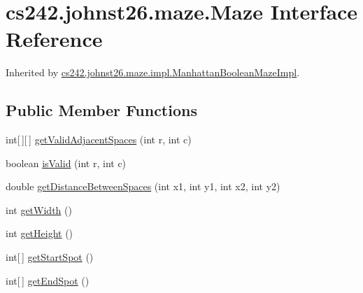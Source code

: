 \hypertarget{interfacecs242_1_1johnst26_1_1maze_1_1_maze}{\section{cs242.\-johnst26.\-maze.\-Maze Interface Reference}
\label{interfacecs242_1_1johnst26_1_1maze_1_1_maze}
}


Inherited by \hyperlink{classcs242_1_1johnst26_1_1maze_1_1impl_1_1_manhattan_boolean_maze_impl}{cs242.\-johnst26.\-maze.\-impl.\-Manhattan\-Boolean\-Maze\-Impl}.

\subsection*{Public Member Functions}
\begin{DoxyCompactItemize}
\item 
int\mbox{[}$\,$\mbox{]}\mbox{[}$\,$\mbox{]} \hyperlink{interfacecs242_1_1johnst26_1_1maze_1_1_maze_a77977c4d474be66cbcf30d4accc33a17}{get\-Valid\-Adjacent\-Spaces} (int r, int c)
\item 
boolean \hyperlink{interfacecs242_1_1johnst26_1_1maze_1_1_maze_a2fcb1817c989cb274297a026ccba8bce}{is\-Valid} (int r, int c)
\item 
double \hyperlink{interfacecs242_1_1johnst26_1_1maze_1_1_maze_a4650d241e235a30bd57dd11a01d9b7aa}{get\-Distance\-Between\-Spaces} (int x1, int y1, int x2, int y2)
\item 
int \hyperlink{interfacecs242_1_1johnst26_1_1maze_1_1_maze_ad0aaaadad9e847f0ab947faf40b35f16}{get\-Width} ()
\item 
int \hyperlink{interfacecs242_1_1johnst26_1_1maze_1_1_maze_a454e672a4513508561e33a055767c53a}{get\-Height} ()
\item 
int\mbox{[}$\,$\mbox{]} \hyperlink{interfacecs242_1_1johnst26_1_1maze_1_1_maze_a58f6990131e1cd198a264d3aa264a708}{get\-Start\-Spot} ()
\item 
int\mbox{[}$\,$\mbox{]} \hyperlink{interfacecs242_1_1johnst26_1_1maze_1_1_maze_ab2aeec8f37daa2af4c13e5df8ca31df3}{get\-End\-Spot} ()
\end{DoxyCompactItemize}

